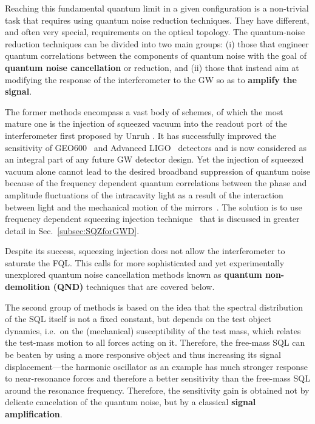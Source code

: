 Reaching this fundamental quantum limit in a given configuration is a non-trivial task that requires using quantum noise reduction techniques. They have different, and often very special, requirements on the optical topology. The quantum-noise reduction techniques can be divided into two main groups: (i) those that engineer quantum correlations between the components of quantum noise with the goal of {\bf quantum noise cancellation} or reduction, and (ii) those that instead aim at modifying the response of the interferometer to the GW so as to {\bf amplify the signal}.

The former methods encompass a vast body of schemes, of which the most mature one is the injection of squeezed vacuum into the readout port of the interferometer first proposed by Unruh \cite{PhysRevD.19.2888}. It has successfully improved the sensitivity of GEO600~\cite{GEOsqueezing} and Advanced LIGO~\cite{Aasi2013NatPhot} detectors and is now considered as an integral part of any future GW detector design. Yet the injection of squeezed vacuum alone cannot lead to the desired broadband suppression of quantum noise because of the frequency dependent quantum correlations between the phase and amplitude fluctuations of the intracavity light as a result of the interaction between light and the mechanical motion of the mirrors~\cite{KLMTV}. The solution is to use frequency dependent squeezing injection technique~\cite{KLMTV} that is discussed in greater detail in Sec.~\ref{subsec:SQZforGWD}.

Despite its success, squeezing injection does not allow the interferometer to saturate the FQL. This calls for more sophisticated and yet experimentally unexplored
quantum noise cancellation methods known as {\bf quantum non-demolition (QND)} techniques that are covered below. 

The second group of methods is based on the idea that the spectral distribution of the SQL itself is not a fixed constant, but depends on the test object dynamics, i.e.\ on the (mechanical) susceptibility of the test mass, which relates the test-mass motion to all forces acting on it. Therefore, the free-mass SQL can be beaten by using a more responsive object and thus increasing its signal displacement---the harmonic oscillator as an example has much stronger response to near-resonance forces and therefore a better sensitivity than the free-mass SQL around the resonance frequency. Therefore, the sensitivity gain is obtained not by delicate cancelation of the
quantum noise, but by a classical {\bf signal amplification}. 

